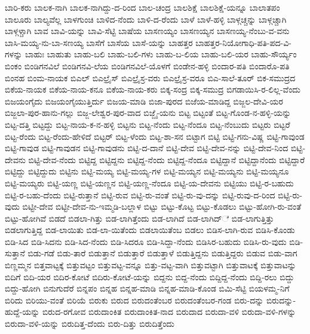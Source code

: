 {ಬಾರಿ-ಕರು
ಬಾಲಕ-ನಾಗಿ
ಬಾಲಕ-ನಾಗಿದ್ದು-ದ-ರಿಂದ
ಬಾಲ-ಚಂದ್ರ
ಬಾಲಶಿಕ್ಷೆ
ಬಾಲಶಿಕ್ಷೆ-ಯನ್ನೂ
ಬಾಲಾತಪಂ
ಬಾಲೂರು
ಬಾಲ್ಯವೆಲ್ಲ
ಬಾಳಗುಂಚಿ
ಬಾಳಿದ-ನೆಂದು
ಬಾಳಿ-ದ-ರೆಂದು
ಬಾಳೆ
ಬಾಳೆ-ಹಳ್ಳಿ
ಬಾಳ್ಗಚ್ಚನ್ನು
ಬಾಳ್ಗಚ್ಚಾಗಿ
ಬಾಳ್ಗಳ್ಚಾಗಿ
ಬಾವ
ಬಾವಿ-ಯನ್ನು
ಬಾವಿ-ಸೆಟ್ಟಿ
ಬಾಷೆಯ
ಬಾಸಣಯ್ಯಂ
ಬಾಸಣಯ್ಯನ
ಬಾಸಣಯ್ಯ-ನೆಂಬು-ವ-ವನು
ಬಾಸಿ-ಮಯ್ಯ-ನು-ಬಾ-ಸಣಯ್ಯ
ಬಾಸೆಗೆ
ಬಾಸೆಯ
ಬಾಸೆ-ಯನ್ನು
ಬಾಹತ್ತರ
ಬಾಹತ್ತರ-ನಿಯೋಗಾಧಿ-ಪತಿ-ಪದ-ವಿ-ಗಳನ್ನು
ಬಾಹುಃ
ಬಾಹುತು
ಬಾಹು-ಬಲಿ
ಬಾಹು-ಬಲಿ-ಗಳು
ಬಾಹು-ಬ-ಲಿಯ
ಬಾಹು-ಬಲಿ-ಯರ
ಬಾಹು-ಸೌರ್ಯ್ಯಂ
ಬಿಂಕಂ
ಬಿಂಡಿಗನವಿಲೆ
ಬಿಂಡಿಗನವಿ-ಲೆಯ
ಬಿಂಡಿಗನವಿಲೆ-ಯೊಳಗೆ
ಬಿಂಡೇನ-ಹಳ್ಳಿ
ಬಿಂದಾರ-ಪತಿ
ಬಿಂದಾರೊ-ಪತಿ
ಬಿಂನಹ
ಬಿಂಮ-ನಾಯಕ
ಬಿಎಲ್
ಬಿಎಲ್ರೈಸ್
ಬಿಎಲ್ರೈಸ್ರ-ವರು
ಬಿಎಲ್ರೈಸ್ರ-ವರೂ
ಬಿಎ-ಸಾಲೆ-ತೂರ್
ಬಿಕ-ಸಮುದ್ರದ
ಬಿಕೆಯ-ನಾಯಕ
ಬಿಕೆಯ-ನಾಯ-ಕನೂ
ಬಿಕೆಯ-ನಾಯ-ಕರು
ಬಿಕ್ಕ-ಸಂದ್ರ
ಬಿಕ್ಕ-ಸಮುದ್ರ
ಬಿಗಡಾಯಿಸಿ-ರ-ಲಿಲ್ಲ-ವೆಂದು
ಬಿಜಯಂಗೈದು
ಬಿಜಯಂಗೈಯುತ್ತಿರ್ದು
ಬಿಜಯ-ಮಾಡಿ
ಬಿಜಾ-ಪುರದ
ಬಿಜೆಯ-ಮಾಡಿದ್ದ
ಬಿಜ್ಜಲ-ದೇವಿ-ಯರ
ಬಿಜ್ಜಲಾ-ಪುರ-ಹಾನು-ಗಲ್ಲು
ಬಿಜ್ಜ-ಲೇಶ್ವರ-ಪುರ-ವಾದ
ಬಿಜ್ಜೈ-ಯನು
ಬಿಟ್ಟ
ಬಿಟ್ಟಂತೆ
ಬಿಟ್ಟ-ಗೊಂಡ-ನ-ಹಳ್ಳಿ-ಯನ್ನು
ಬಿಟ್ಟ-ದತ್ತಿ
ಬಿಟ್ಟದ್ದು
ಬಿಟ್ಟ-ನಾಯ-ಕ-ನ-ಹಳ್ಳಿ
ಬಿಟ್ಟನು
ಬಿಟ್ಟ-ನೆಂದು
ಬಿಟ್ಟ-ನೆಂದೂ
ಬಿಟ್ಟ-ನೆಂಬುದು
ಬಿಟ್ಟರು
ಬಿಟ್ಟರೆ
ಬಿಟ್ಟ-ರೆಂದು
ಬಿಟ್ಟ-ರೆಂದು-ಹೇಳಿದೆ
ಬಿಟ್ಟರ್
ಬಿಟ್ಟ-ಳೆಂದು
ಬಿಟ್ಟ-ಶಾ-ಸನ
ಬಿಟ್ಟಾಗ
ಬಿಟ್ಟಿ
ಬಿಟ್ಟಿ-ಗನು-ವಿಷ್ಣ
ಬಿಟ್ಟಿ-ಗಾವುಂಡ
ಬಿಟ್ಟಿ-ಗಾವುಡ
ಬಿಟ್ಟಿ-ಗಾವುಡನ
ಬಿಟ್ಟಿ-ಗಾವುಡನು
ಬಿಟ್ಟಿ-ದ-ದಾನೆ
ಬಿಟ್ಟಿ-ದೇವ
ಬಿಟ್ಟಿ-ದೇವ-ನನ್ನು
ಬಿಟ್ಟಿ-ದೇವ-ನಿಂದ
ಬಿಟ್ಟಿ-ದೇವನು
ಬಿಟ್ಟಿ-ದೇವ-ನೆಂದು
ಬಿಟ್ಟಿದ್ದ
ಬಿಟ್ಟಿದ್ದನು
ಬಿಟ್ಟಿದ್ದ-ನೆಂದು
ಬಿಟ್ಟಿದ್ದ-ನೆಂದೂ
ಬಿಟ್ಟಿದ್ದಾನೆ
ಬಿಟ್ಟಿದ್ದಾನೆಂದು
ಬಿಟ್ಟಿದ್ದಾರೆ
ಬಿಟ್ಟಿದ್ದು
ಬಿಟ್ಟಿದ್ದುದು
ಬಿಟ್ಟಿನು
ಬಿಟ್ಟಿ-ಮಯ್ಯ
ಬಿಟ್ಟಿ-ಮಯ್ಯ-ಗಳ
ಬಿಟ್ಟಿ-ಮಯ್ಯನ
ಬಿಟ್ಟಿ-ಮಯ್ಯನು
ಬಿಟ್ಟಿ-ಮಯ್ಯನೂ
ಬಿಟ್ಟಿ-ಮಯ್ಯರು
ಬಿಟ್ಟಿ-ಯಣ್ಣ
ಬಿಟ್ಟಿ-ಯಣ್ಣನ
ಬಿಟ್ಟಿ-ಯಣ್ಣ-ನೆಂದೂ
ಬಿಟ್ಟಿ-ಯ-ದೇವನು
ಬಿಟ್ಟಿಯು
ಬಿಟ್ಟಿ-ರ-ಬಹುದು
ಬಿಟ್ಟಿ-ರ-ಬಹು-ದೆಂದು
ಬಿಟ್ಟಿ-ರುತ್ತಾನೆ
ಬಿಟ್ಟಿ-ರುವ
ಬಿಟ್ಟಿ-ರು-ವಂತೆ
ಬಿಟ್ಟಿ-ರು-ವು-ದನ್ನು
ಬಿಟ್ಟಿ-ರುವು-ದ-ರಿಂದ
ಬಿಟ್ಟಿ-ರು-ವುದು
ಬಿಟ್ಟೀ-ದೇವ
ಬಿಟ್ಟೀ-ದೇವ-ನು-ಇಮ್ಮಡಿ-ಬಲ್ಲಾಳ
ಬಿಟ್ಟು
ಬಿಟ್ಟು-ಕೊಟ್ಟ
ಬಿಟ್ಟು-ಕೊಡಲು
ಬಿಟ್ಟು-ಹೋಗಿ-ರು-ವಂತೆ
ಬಿಟ್ಟು-ಹೋಗಿವೆ
ಬಿಡದೆ
ಬಿಡಲಾ-ಗಿತ್ತು
ಬಿಡ-ಲಾಗಿತ್ತೆಂದು
ಬಿಡ-ಲಾಗಿದೆ
ಬಿಡ-ಲಾಗಿದ್ೆ
ಬಿಡ-ಲಾಗುತ್ತಿತ್ತು
ಬಿಡಲಾಗುತ್ತಿದ್ದ
ಬಿಡ-ಲಾಯಿತು
ಬಿಡ-ಲಾ-ಯಿತೆಂದು
ಬಿಡಲಾಯಿತೆಂಬ
ಬಿಡಲು
ಬಿಡಿಸ-ಲಾಗಿ-ರುವ
ಬಿಡಿಸಿ-ಕೊಂಡು
ಬಿಡಿ-ಸಿದ
ಬಿಡಿ-ಸಿದನು
ಬಿಡಿ-ಸಿದ-ನೆಂದು
ಬಿಡಿ-ಸಿದರೂ
ಬಿಡಿ-ಸಿದ್ದಾ-ನೆಂದು
ಬಿಡಿಸಿರ-ಬಹುದು
ಬಿಡಿಸಿ-ರು-ವುದು
ಬಿಡಿ-ಸುತ್ತಾನೆ
ಬಿಡು-ಗಡೆ
ಬಿಡು-ತಾರೆ
ಬಿಡುತ್ತಾನೆ
ಬಿಡುತ್ತಾರೆ
ಬಿಡುತ್ತಾಳೆ
ಬಿಡುತ್ತಿದ್ದನು
ಬಿಡುತ್ತಿದ್ದರು
ಬಿಡುವ
ಬಿಡು-ವಾಗ
ಬಿಣ್ಣಮ್ಮನ
ಬಿತ್ತವಾಟ್ಟಕ್ಕೆ
ಬಿತ್ತುವಟ್ಟಂ
ಬಿತ್ತುವಟ್ಟ-ವನ್ನೂ
ಬಿತ್ತು-ವಟ್ಟ-ವಾಗಿ
ಬಿತ್ತುವಟ್ಟಾಗಿ
ಬಿತ್ತುವಾಟಕ್ಕೆ
ಬಿತ್ತುವಾಟನ್ನು
ಬಿದಿಗೆ
ಬಿದಿ-ಯರ
ಬಿದಿರ-ಕೋಟೆ
ಬಿದಿರು-ಕೋಟೆ-ಯನ್ನು
ಬಿದ್ದನು
ಬಿದ್ದ-ನೆಂದು
ಬಿದ್ದಿದ್ದ-ನೆಂದು
ಬಿದ್ದಿ-ರಲು
ಬಿದ್ದು
ಬಿದ್ದು-ಹೋಗಿ
ಬಿನುಗುದೆರೆ
ಬಿನ್ನಪಂ
ಬಿನ್ನಹ
ಬಿನ್ನಹ-ಮಾಡಿ
ಬಿನ್ನಹ-ಮಾಡಿ-ಕೊಂಡ
ಬಿಮಿ-ಸೆಟ್ಟಿ
ಬಿಯಳಮ್ಮ-ನಿಗೆ
ಬಿರಿದು
ಬಿರಿಯು-ವಂತೆ
ಬಿರಿಯೆ
ಬಿರುಕು
ಬಿರುದ
ಬಿರುದಂತೆಂಬರ
ಬಿರುದಂತೆಂಬರ-ಗಂಡ
ಬಿರು-ದನ್ನು
ಬಿರುದನ್ನು-ಹುದ್ದೆ-ಯನ್ನು
ಬಿರುದ-ರಗೋವ
ಬಿರುದಾಂಕಿತ
ಬಿರುದಾಂಕಿತ-ನಾದ
ಬಿರುದಾದ
ಬಿರುದಾ-ವಳಿ
ಬಿರುದಾ-ವಳಿ-ಗಳನ್ನು
ಬಿರುದಾ-ವಳಿ-ಯನ್ನು
ಬಿರುದಿತ್ತ-ದೆಂದು
ಬಿರು-ದಿತ್ತು
ಬಿರುದಿತ್ತೆಂದು
}
